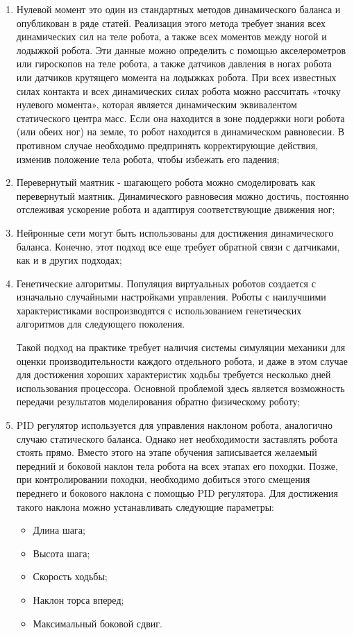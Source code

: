 \begin{enumerate}
	\item Нулевой момент это один из стандартных методов динамического баланса и опубликован в ряде статей. Реализация этого метода требует знания всех динамических сил на теле робота, а также всех моментов между ногой и лодыжкой робота. Эти данные можно определить с помощью акселерометров или гироскопов на теле робота, а также датчиков давления в ногах робота или датчиков крутящего момента на лодыжках робота. При всех известных силах контакта и всех динамических силах робота можно рассчитать «точку нулевого момента», которая является динамическим эквивалентом статического центра масс. Если она находится в зоне поддержки ноги робота (или обеих ног) на земле, то робот находится в динамическом равновесии. В противном случае необходимо предпринять корректирующие действия, изменив положение тела робота, чтобы избежать его падения;
	\item Перевернутый маятник - шагающего робота можно смоделировать как перевернутый маятник. Динамического равновесия можно достичь, постоянно отслеживая ускорение робота и адаптируя соответствующие движения ног;
	\item Нейронные сети могут быть использованы для достижения динамического баланса. Конечно, этот подход все еще требует обратной связи с датчиками, как и в других подходах;
	\item Генетические алгоритмы. Популяция виртуальных роботов создается с изначально случайными настройками управления. Роботы с наилучшими характеристиками воспроизводятся с использованием генетических алгоритмов для следующего поколения.

	Такой подход на практике требует наличия системы симуляции механики для оценки производительности каждого отдельного робота, и даже в этом случае для достижения хороших характеристик ходьбы требуется несколько дней использования процессора. Основной проблемой здесь является возможность передачи результатов моделирования обратно физическому роботу;
	\item PID регулятор используется для управления наклоном робота, аналогично случаю статического баланса. Однако нет необходимости заставлять робота стоять прямо. Вместо этого на этапе обучения записывается желаемый передний и боковой наклон тела робота на всех этапах его походки. Позже, при контролировании походки, необходимо добиться этого смещения переднего и бокового наклона с помощью PID регулятора. Для достижения такого наклона можно устанавливать следующие параметры:
	\begin{itemize}
		\item Длина шага;
		\item Высота шага;
		\item Скорость ходьбы;
		\item Наклон торса вперед;
		\item Максимальный боковой сдвиг.
	\end{itemize}
	

\end{enumerate}
